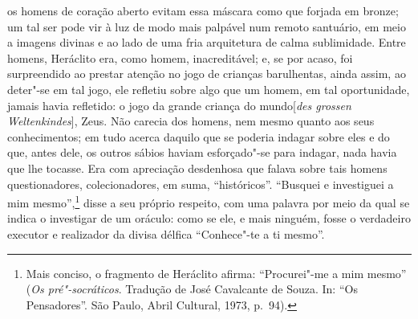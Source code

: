    os homens de coração aberto evitam essa máscara como que forjada em
   bronze; um tal ser pode vir à luz de modo mais palpável num remoto
   santuário, em meio a imagens divinas e ao lado de uma fria arquitetura de
   calma sublimidade. Entre homens, Heráclito era, como homem, inacreditável;
   e, se por acaso, foi surpreendido ao prestar atenção no jogo de crianças
   barulhentas, ainda assim, ao deter"-se em tal jogo, ele refletiu sobre
   algo que um homem, em tal oportunidade, jamais havia refletido: o jogo da
   grande criança do mundo[\textit{des grossen Weltenkindes}], Zeus. Não
   carecia dos homens, nem mesmo quanto aos seus conhecimentos; em tudo
   acerca daquilo que se poderia indagar sobre eles e do que, antes dele, os
   outros sábios haviam esforçado"-se para indagar, nada havia que lhe
   tocasse. Era com apreciação desdenhosa que falava sobre tais homens
   questionadores, colecionadores, em suma, ``históricos''. ``Busquei e
   investiguei a mim mesmo'',\footnote{ Mais conciso, o fragmento de
   Heráclito afirma: ``Procurei"-me a mim mesmo'' (\textit{Os pré"-socráticos}. 
   Tradução de José Cavalcante de Souza. In: ``Os
   Pensadores''. São Paulo, Abril Cultural, 1973, p.~94).} disse a seu
   próprio respeito, com uma palavra por meio da qual se indica o investigar
   de um oráculo: como se ele, e mais ninguém, fosse o verdadeiro executor e
   realizador da divisa délfica ``Conhece"-te a ti mesmo''.

